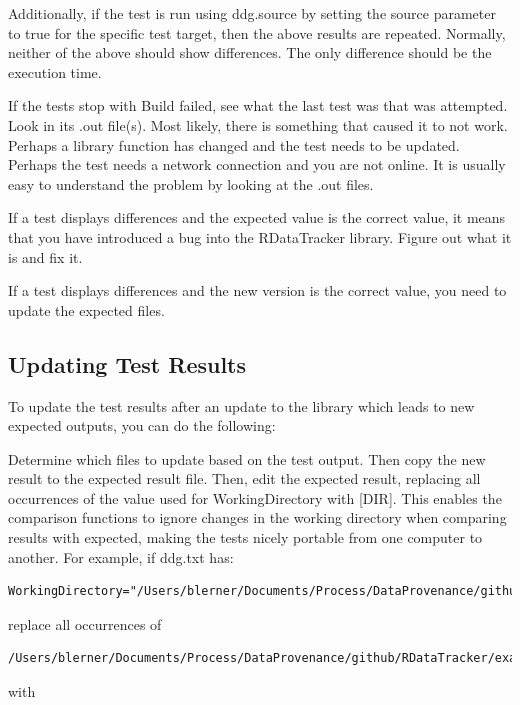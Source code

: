 \documentclass[12pt]{article}
\begin{document}
Additionally, if the test is run using ddg.source by setting the source parameter to true for the specific test target, then the above results are repeated. Normally, neither of the above should show differences. The only difference should be the execution time.

If the tests stop with Build failed, see what the last test was that was attempted.
Look in its .out file(s).  Most likely, there is something that caused it to 
not work.  Perhaps a library function has changed and the test needs to be
updated.  Perhaps the test needs a network connection and you are not online.
It is usually easy to understand the problem by looking at the .out files.

If a test displays differences and the expected value is the correct value, it 
means that you have introduced a bug into the RDataTracker library.  Figure out
what it is and fix it.

If a test displays differences and the new version is the correct value, you need
to update the expected files. 

\subsection{Updating Test Results}
\label{sec:update_tests}
To update the test results after an update to the library which leads to new expected outputs, you can do the following:

Determine which files to update based on the test output.  Then copy the new result to the expected result file.  Then, edit the expected result, replacing all occurrences of the value used for WorkingDirectory with [DIR].  This enables the comparison functions to ignore changes in the working directory when comparing results with expected, making the tests nicely portable from
one computer to another.  For example, if ddg.txt has:

\begin{lstlisting}
WorkingDirectory="/Users/blerner/Documents/Process/DataProvenance/github/RDataTracker/examples/consoleSource"
\end{lstlisting}  

replace all occurrences of 

\begin{lstlisting}
/Users/blerner/Documents/Process/DataProvenance/github/RDataTracker/examples/consoleSource
\end{lstlisting}

with 
\end{document}
